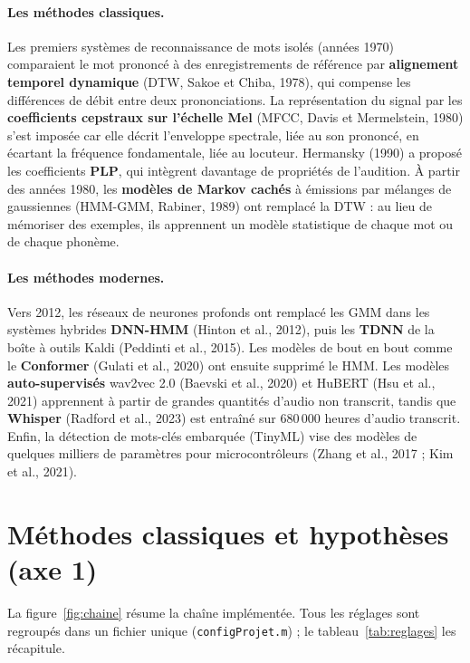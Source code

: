 \documentclass[11pt,a4paper]{article}
\begin{document}
\paragraph{Les méthodes classiques.} Les premiers systèmes de reconnaissance de mots isolés (années 1970) comparaient le mot prononcé à des enregistrements de référence par \textbf{alignement temporel dynamique} (DTW, Sakoe et Chiba, 1978), qui compense les différences de débit entre deux prononciations. La représentation du signal par les \textbf{coefficients cepstraux sur l'échelle Mel} (MFCC, Davis et Mermelstein, 1980) s'est imposée car elle décrit l'enveloppe spectrale, liée au son prononcé, en écartant la fréquence fondamentale, liée au locuteur. Hermansky (1990) a proposé les coefficients \textbf{PLP}, qui intègrent davantage de propriétés de l'audition. À partir des années 1980, les \textbf{modèles de Markov cachés} à émissions par mélanges de gaussiennes (HMM-GMM, Rabiner, 1989) ont remplacé la DTW : au lieu de mémoriser des exemples, ils apprennent un modèle statistique de chaque mot ou de chaque phonème.

\paragraph{Les méthodes modernes.} Vers 2012, les réseaux de neurones profonds ont remplacé les GMM dans les systèmes hybrides \textbf{DNN-HMM} (Hinton et al., 2012), puis les \textbf{TDNN} de la boîte à outils Kaldi (Peddinti et al., 2015). Les modèles de bout en bout comme le \textbf{Conformer} (Gulati et al., 2020) ont ensuite supprimé le HMM. Les modèles \textbf{auto-supervisés} wav2vec 2.0 (Baevski et al., 2020) et HuBERT (Hsu et al., 2021) apprennent à partir de grandes quantités d'audio non transcrit, tandis que \textbf{Whisper} (Radford et al., 2023) est entraîné sur 680\,000 heures d'audio transcrit. Enfin, la détection de mots-clés embarquée (TinyML) vise des modèles de quelques milliers de paramètres pour microcontrôleurs (Zhang et al., 2017 ; Kim et al., 2021).

\section{Méthodes classiques et hypothèses (axe 1)}\label{sec:methodes}

La figure~\ref{fig:chaine} résume la chaîne implémentée. Tous les réglages sont regroupés dans un fichier unique (\texttt{configProjet.m}) ; le tableau~\ref{tab:reglages} les récapitule.
\end{document}
